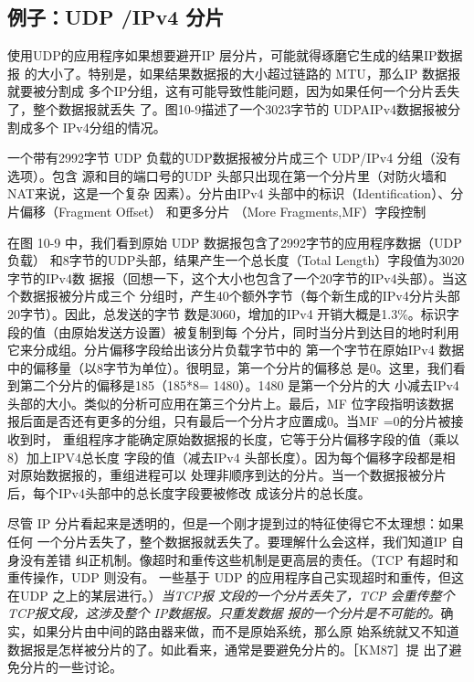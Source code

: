 \subsection{例子：UDP /IPv4 分片}

使用UDP的应用程序如果想要避开IP 层分片，可能就得琢磨它生成的结果IP数据报
的大小了。特别是，如果结果数据报的大小超过链路的 MTU，那么IP 数据报就要被分割成
多个IP分组，这有可能导致性能问题，因为如果任何一个分片丢失了，整个数据报就丢失
了。图10-9描述了一个3023字节的 UDPAIPv4数据报被分割成多个 IPv4分组的情况。


一个带有2992字节 UDP 负载的UDP数据报被分片成三个 UDP/IPv4 分组（没有选项）。包含
源和目的端口号的UDP 头部只出现在第一个分片里（对防火墙和 NAT来说，这是一个复杂
因素）。分片由IPv4 头部中的标识（Identification）、分片偏移（Fragment Offset） 和更多分片
（More Fragments,MF）字段控制

在图 10-9 中，我们看到原始 UDP 数据报包含了2992字节的应用程序数据（UDP 负载）
和8字节的UDP头部，结果产生一个总长度（Total Length）字段值为3020字节的IPv4数
据报（回想一下，这个大小也包含了一个20字节的IPv4头部）。当这个数据报被分片成三个
分组时，产生40个额外字节（每个新生成的IPv4分片头部20字节）。因此，总发送的字节
数是3060，增加的IPv4 开销大概是1.3\%。标识字段的值（由原始发送方设置）被复制到每
个分片，同时当分片到达目的地时利用它来分成组。分片偏移字段给出该分片负载字节中的
第一个字节在原始IPv4 数据中的偏移量（以8字节为单位）。很明显，第一个分片的偏移总
是0。这里，我们看到第二个分片的偏移是185（185*8= 1480）。1480 是第一个分片的大
小减去IPv4 头部的大小。类似的分析可应用在第三个分片上。最后，MF 位字段指明该数据
报后面是否还有更多的分组，只有最后一个分片才应置成0。当MF =0的分片被接收到时，
重组程序才能确定原始数据报的长度，它等于分片偏移字段的值（乘以8）加上IPV4总长度
字段的值（减去IPv4 头部长度）。因为每个偏移字段都是相对原始数据报的，重组进程可以
处理非顺序到达的分片。当一个数据报被分片后，每个IPv4头部中的总长度字段要被修改
成该分片的总长度。

尽管 IP 分片看起来是透明的，但是一个刚才提到过的特征使得它不太理想：如果任何
一个分片丢失了，整个数据报就丢失了。要理解什么会这样，我们知道IP 自身没有差错
纠正机制。像超时和重传这些机制是更高层的责任。（TCP 有超时和重传操作，UDP 则没有。
一些基于 UDP 的应用程序自己实现超时和重传，但这在UDP 之上的某层进行。）\emph{当TCP报
文段的一个分片丢失了，TCP 会重传整个 TCP报文段，这涉及整个 IP数据报。只重发数据
报的一个分片是不可能的。}确实，如果分片由中间的路由器来做，而不是原始系统，那么原
始系统就又不知道数据报是怎样被分片的了。如此看来，通常是要避免分片的。［KM87］提
出了避免分片的一些讨论。

